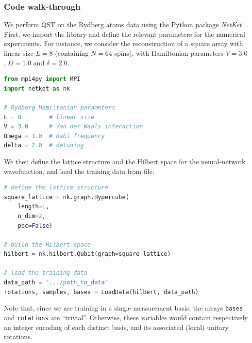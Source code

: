 \documentclass[twocolumn,english,reprint,superscriptaddress,longbibliography,pra]{revtex4-1}
\begin{document}
\subsubsection*{Code walk-through}
We perform QST on the Rydberg atoms data using the Python package {\it NetKet}~\cite{netket}. First, we import the library and define the relevant parameters for the numerical experiments. For instance, we consider the reconstruction of a square array with linear size $L=8$ (containing $N=64$ spins), with Hamiltonian parameters $V=3.0$, $\Omega=1.0$ and $\delta=2.0$.

\begin{lstlisting}[language=Python,numbers=none]
from mpi4py import MPI
import netket as nk

# Rydberg Hamiltonian parameters
L = 8        # linear size
V = 3.0      # Van der Waals interaction
Omega = 1.0  # Rabi frequency
delta = 2.0  # detuning
\end{lstlisting}

We then define the lattice structure and the Hilbert space for the neural-network wavefunction, and load the training data from file:
\begin{lstlisting}[language=Python,numbers=none]
# define the lattice structure
square_lattice = nk.graph.Hypercube(
    length=L, 
    n_dim=2, 
    pbc=False)

# build the Hilbert space
hilbert = nk.hilbert.Qubit(graph=square_lattice)

# load the training data
data_path = ".../path_to_data"
rotations, samples, bases = LoadData(hilbert, data_path)
\end{lstlisting}
Note that, since we are training in a single measurement basis, the arrays \texttt{bases}  and \texttt{rotations} are ``trivial''. Otherwise, these variables would contain respectively an integer encoding of each distinct basis, and its associated (local) unitary rotations. 
\end{document}
